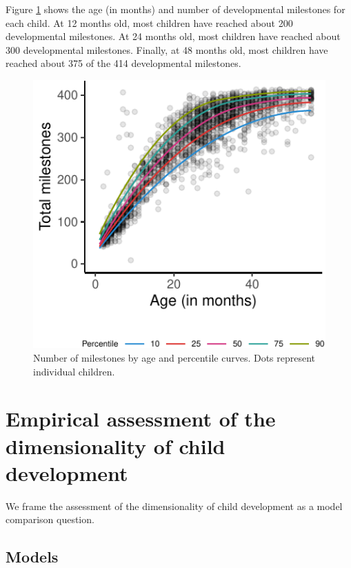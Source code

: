 \documentclass[10pt, letterpaper]{article}
\newenvironment{CodeChunk}{}{}
\begin{document}
Figure \ref{fig:growth} shows the age (in months) and number of
developmental milestones for each child. At 12 months old, most children
have reached about 200 developmental milestones. At 24 months old, most
children have reached about 300 developmental milestones. Finally, at 48
months old, most children have reached about 375 of the 414
developmental milestones.

\begin{CodeChunk}
\begin{figure}[tb]
\includegraphics{figs/growth-1} \caption[Number of milestones by age and percentile curves]{Number of milestones by age and percentile curves. Dots represent individual children. }\label{fig:growth}
\end{figure}
\end{CodeChunk}

\hypertarget{empirical-assessment-of-the-dimensionality-of-child-development}{%
\section{Empirical assessment of the dimensionality of child
development}\label{empirical-assessment-of-the-dimensionality-of-child-development}}

We frame the assessment of the dimensionality of child development as a
model comparison question.

\hypertarget{models}{%
\subsection{Models}\label{models}}
\end{document}
